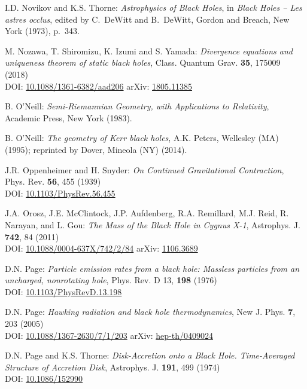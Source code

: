 \begin{thebibliography}{123}
I.D. Novikov and K.S. Thorne: {\em Astrophysics of Black Holes},
in {\em Black Holes -- Les astres occlus},  edited by C.~DeWitt and B.~DeWitt,
Gordon and Breach, New York (1973), p.~343.

M. Nozawa, T. Shiromizu, K. Izumi and S. Yamada:
{\em Divergence equations and uniqueness theorem of static black holes},
Class. Quantum Grav. {\bf 35}, 175009 (2018)\\
DOI: \href{https://doi.org/10.1088/1361-6382/aad206}{10.1088/1361-6382/aad206}\hfill
arXiv: \href{https://arxiv.org/abs/1805.11385}{1805.11385}

B. O'Neill: {\em Semi-Riemannian Geometry, with Applications to Relativity},
Academic Press, New York (1983).

B. O'Neill: {\em The geometry of Kerr black holes}, A.K. Peters, Wellesley (MA) (1995);
reprinted by Dover, Mineola (NY) (2014).

J.R. Oppenheimer and H. Snyder:
{\em On Continued Gravitational Contraction},
Phys. Rev. {\bf 56}, 455 (1939)\\
DOI: \href{https://doi.org/10.1103/PhysRev.56.455}{10.1103/PhysRev.56.455}

J.A. Orosz, J.E. McClintock, J.P. Aufdenberg, R.A. Remillard, M.J. Reid, R. Narayan, and L. Gou:
{\em The Mass of the Black Hole in Cygnus X-1},
Astrophys. J. {\bf 742}, 84 (2011)\\
DOI: \href{https://doi.org/10.1088/0004-637X/742/2/84}{10.1088/0004-637X/742/2/84}\hfill
arXiv: \href{https://arxiv.org/abs/1106.3689}{1106.3689}

D.N. Page:
{\em Particle emission rates from a black hole: Massless particles from an uncharged, nonrotating hole},
Phys. Rev. D 13, {\bf 198} (1976)\\
DOI: \href{https://doi.org/10.1103/PhysRevD.13.198}{10.1103/PhysRevD.13.198}

D.N. Page:
{\em Hawking radiation and black hole thermodynamics},
New J. Phys. {\bf 7}, 203 (2005)\\
DOI: \href{https://doi.org/10.1088/1367-2630/7/1/203}{10.1088/1367-2630/7/1/203}\hfill
arXiv: \href{https://arxiv.org/abs/hep-th/0409024}{hep-th/0409024}

D.N. Page and K.S. Thorne:
{\em Disk-Accretion onto a Black Hole. Time-Averaged Structure of Accretion Disk},
Astrophys. J. {\bf 191}, 499 (1974)\\
DOI: \href{https://doi.org/10.1086/152990}{10.1086/152990}


\end{thebibliography}
